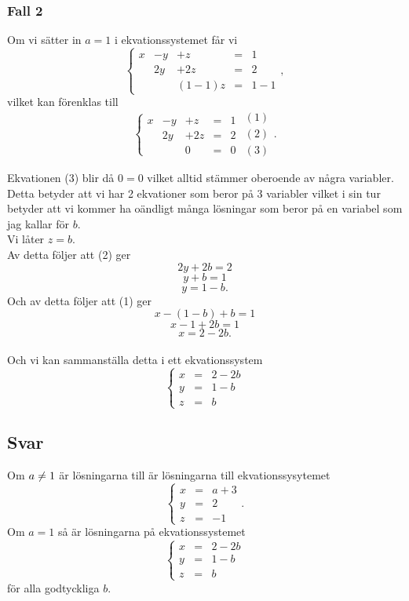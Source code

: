 \documentclass[11pt]{article}
\begin{document}
\subsubsection{Fall 2}
Om vi sätter in $a = 1$ i ekvationssystemet får vi
$$
\left\{\begin{array}{ccccc}
 x & -y & +z & = & 1 \\
  & 2y & +2z & = & 2\\
  &  & (1-1)z & = & 1-1
\end{array}\right.
,$$
vilket kan förenklas till
$$
\left\{\begin{array}{ccccc}
 x & -y & +z & = & 1 \\
  & 2y & +2z & = & 2\\
  &  & 0 & = & 0
\end{array}\right.
\begin{array}{c}
(1)\\ (2) \\ (3)
\end{array}
 .$$
 
 Ekvationen (3) blir då $0 = 0$ vilket alltid stämmer oberoende av några variabler. Detta betyder att vi har 2 ekvationer som beror på 3 variabler vilket i sin tur betyder att vi kommer ha oändligt många lösningar som beror på en variabel som jag kallar för $b$.\\
 Vi låter $z = b$.\\
 Av detta följer att (2) ger
 $$2y + 2b= 2$$
 $$y+b=1$$
 $$y= 1-b.$$
 Och av detta följer att (1) ger
 $$x -(1-b)+b = 1$$
 $$x - 1 +2b = 1$$
 $$x = 2 - 2b.$$\\
 Och vi kan sammanställa detta i ett ekvationssystem
 $$
\left\{\begin{array}{ccc}
 x & = & 2-2b	\\
 y & = & 1-b	\\
 z & = & b
\end{array}\right.
$$
\subsection{Svar}
Om $a \centernot = 1$ är lösningarna till är lösningarna till ekvationssysytemet
$$
\left\{\begin{array}{ccc}
 x & = & a+3\\
 y & = & 2\\
 z & = & -1
\end{array}\right.
.$$
Om $a=1$ så är lösningarna på ekvationssystemet
$$
\left\{\begin{array}{ccc}
 x & = & 2-2b	\\
 y & = & 1-b	\\
 z & = & b
\end{array}\right.
$$
för alla godtyckliga $b$.
\end{document}
